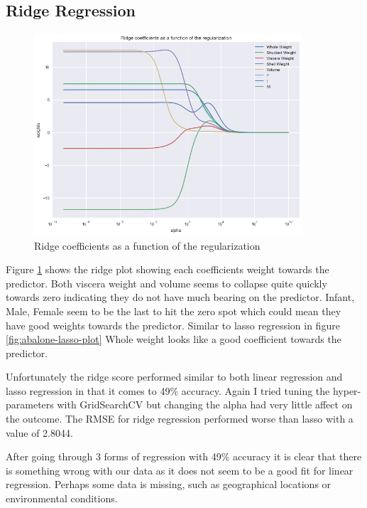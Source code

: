 \subsection{Ridge Regression}

\begin{figure}[H]
  \centering
  \includegraphics[scale=0.5,width=100mm]{./images/abalone-ridge-regression.png}
  \caption{Ridge coefficients as a function of the regularization}
  \label{fig:abalone-ridge-plot}
\end{figure}

Figure \ref{fig:abalone-ridge-plot} shows the ridge plot showing each coefficients weight towards the predictor. Both viscera weight and volume seems to collapse quite quickly towards zero indicating they do not have much bearing on the predictor. Infant, Male, Female seem to be the last to hit the zero spot which could mean they have good weights towards the predictor. Similar to lasso regression in figure \ref{fig:abalone-lasso-plot} Whole weight looks like a good coefficient towards the predictor. 

Unfortunately the ridge score performed similar to both linear regression and lasso regression in that it comes to 49\% accuracy. Again I tried tuning the hyper-parameters with GridSearchCV but changing the alpha had very little affect on the outcome. The RMSE for ridge regression performed worse than lasso with a value of 2.8044.

After going through 3 forms of regression with 49\% accuracy it is clear that there is something wrong with our data as it does not seem to be a good fit for linear regression. Perhaps some data is missing, such as geographical locations or environmental conditions.